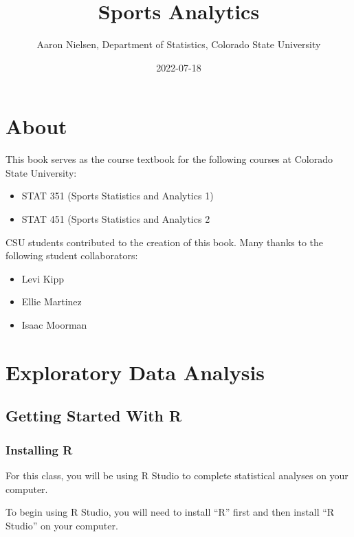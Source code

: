 \documentclass[
  11pt,
]{book}
\title{Sports Analytics}
\author{Aaron Nielsen, Department of Statistics, Colorado State University}
\date{2022-07-18}
\theoremstyle{definition}
\theoremstyle{definition}
\theoremstyle{definition}
\theoremstyle{definition}
\theoremstyle{remark}
\begin{document}
\maketitle

{
\setcounter{tocdepth}{1}
\tableofcontents
}
\hypertarget{about}{%
\chapter*{About}\label{about}}

This book serves as the course textbook for the following courses at Colorado State University:

\begin{itemize}
\item
  STAT 351 (Sports Statistics and Analytics 1)
\item
  STAT 451 (Sports Statistics and Analytics 2
\end{itemize}

\hfill\break

CSU students contributed to the creation of this book. Many thanks to the following student collaborators:

\begin{itemize}
\item
  Levi Kipp
\item
  Ellie Martinez
\item
  Isaac Moorman
\end{itemize}

\hypertarget{exploratory-data-analysis}{%
\chapter{Exploratory Data Analysis}\label{exploratory-data-analysis}}

\hypertarget{getting-started-with-r}{%
\section{Getting Started With R}\label{getting-started-with-r}}

\hypertarget{installing-r}{%
\subsection{Installing R}\label{installing-r}}

For this class, you will be using R Studio to complete statistical analyses on your computer.

To begin using R Studio, you will need to install ``R'' first and then install ``R Studio'' on your computer.
\end{document}
